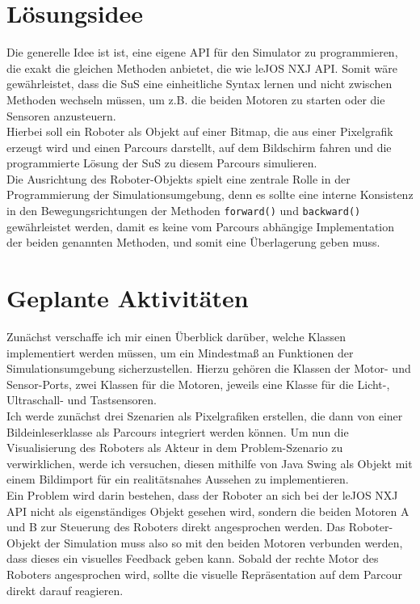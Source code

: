 \documentclass[paper=a4, pagesize, DIV=calc, BCOR=12.5mm, twoside=on, onecolumn=on, open = any, titlepage =on, parskip =half-, headsepline = on, footsepline = on, chapterprefix = on, appendixprefix = off, fontsize = 12pt, numbers = noenddot, abstract = on]{scrbook}
\numberwithin{equation}{chapter}
\begin{document}
\par \singlespacing
\section*{Lösungsidee}
\onehalfspacing
Die generelle Idee ist ist, eine eigene API für den Simulator zu programmieren, die exakt die gleichen Methoden anbietet, die wie leJOS NXJ API. Somit wäre gewährleistet, dass die SuS eine einheitliche Syntax lernen und nicht zwischen Methoden wechseln müssen, um z.B. die beiden Motoren zu starten oder die Sensoren anzusteuern.\\
Hierbei soll ein Roboter als Objekt auf einer Bitmap, die aus einer Pixelgrafik erzeugt wird und einen Parcours darstellt, auf dem Bildschirm fahren und die programmierte Lösung der SuS zu diesem Parcours simulieren.\\
Die Ausrichtung des Roboter-Objekts spielt eine zentrale Rolle in der Programmierung der Simulationsumgebung, denn es sollte eine interne Konsistenz in den Bewegungsrichtungen der Methoden \texttt{forward()} und \texttt{backward()} gewährleistet werden, damit es keine vom Parcours abhängige Implementation der beiden genannten Methoden, und somit eine Überlagerung geben muss.

\par \singlespacing
\section*{Geplante Aktivitäten}
\onehalfspacing
Zunächst verschaffe ich mir einen Überblick darüber, welche Klassen implementiert werden müssen, um ein Mindestmaß an Funktionen der Simulationsumgebung sicherzustellen. Hierzu gehören die Klassen der Motor- und Sensor-Ports, zwei Klassen für die Motoren, jeweils eine Klasse für die Licht-, Ultraschall- und Tastsensoren.\\
Ich werde zunächst drei Szenarien als Pixelgrafiken erstellen, die dann von einer Bildeinleserklasse als Parcours integriert werden können. Um nun die Visualisierung des Roboters als Akteur in dem Problem-Szenario zu verwirklichen, werde ich versuchen, diesen mithilfe von Java Swing als Objekt mit einem Bildimport für ein realitätsnahes Aussehen zu implementieren. \\
Ein Problem wird darin bestehen, dass der Roboter an sich bei der leJOS NXJ API nicht als eigenständiges Objekt gesehen wird, sondern die beiden Motoren A und B zur Steuerung des Roboters direkt angesprochen werden. Das Roboter-Objekt der Simulation muss also so mit den beiden Motoren verbunden werden, dass dieses ein visuelles Feedback geben kann. Sobald der rechte Motor des Roboters angesprochen wird, sollte die visuelle Repräsentation auf dem Parcour direkt darauf reagieren. 
\end{document}
